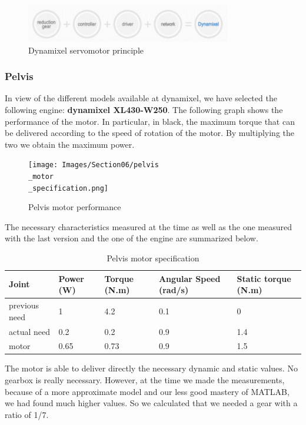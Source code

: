 \begin{figure}[ht]
    \centering
    \includegraphics[width=0.8\textwidth]{Images/Section06/dynamixel.png}
    \caption{Dynamixel servomotor principle}
    \label{fig:DynamixelPrinciple}
\end{figure}
\FloatBarrier

\subsubsection{Pelvis}

In view of the different models available at dynamixel, we have selected the following engine: \textbf{dynamixel XL430-W250}. The following graph shows the performance of the motor. In particular, in black, the maximum torque that can be delivered according to the speed of rotation of the motor. By multiplying the two we obtain the maximum power.
\begin{figure}[ht]
    \centering
    \texttt{[image: Images/Section06/pelvis\\\_motor\\\_specification.png]}
    \caption{Pelvis motor performance}
    \label{fig:PelvisMotor}
\end{figure}
\FloatBarrier

\bigbreak
The necessary characteristics measured at the time as well as the one measured with the last version and the one of the engine are summarized below.
\begin{table}[ht]
    \centering
    \begin{tabular}{|p{1.5cm} | p{2cm} | p{2.5cm}| p{2.7cm} | p{2.7cm} |} 
        \hline
        \textbf{Joint}& \textbf{Power (W)} & \textbf{Torque (N.m)} & \textbf{Angular Speed (rad/s)} & \textbf{Static torque (N.m)}\\ [0.3ex]
        \hline
        previous need & 1 & 4.2 & 0.1 & 0 \\ 
        \hline
        actual need & 0.2 & 0.2 & 0.9 & 1.4 \\ 
        \hline
        motor & 0.65 & 0.73 & 0.9 & 1.5\\ 
        \hline
    \end{tabular}
    \caption{Pelvis motor specification}
\end{table}
\FloatBarrier
The motor is able to deliver directly the necessary dynamic and static values. No gearbox is really necessary. However, at the time we made the measurements, because of a more approximate model and our less good mastery of MATLAB, we had found much higher values. So we calculated that we needed a gear with a ratio of 1/7.

